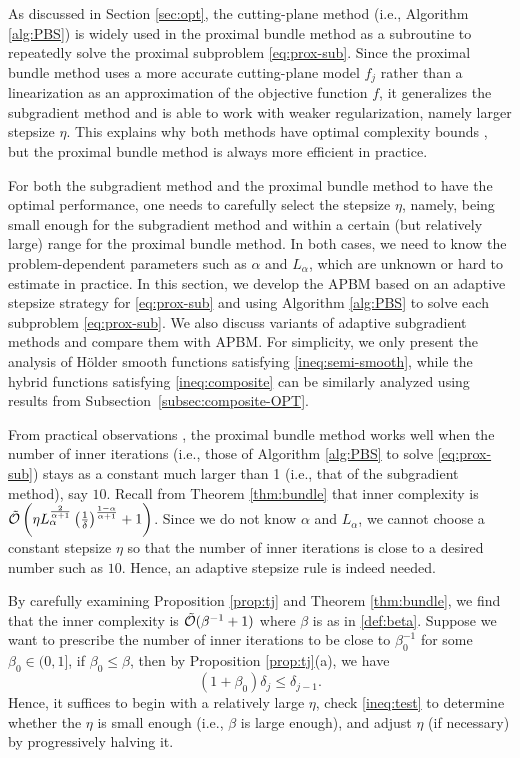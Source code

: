 \documentclass[11pt,letterpaper]{article}
\begin{document}
As discussed in Section \ref{sec:opt}, the cutting-plane method (i.e., Algorithm \ref{alg:PBS}) is widely used in the proximal bundle method as a subroutine to repeatedly solve the proximal subproblem \eqref{eq:prox-sub}.
Since the proximal bundle method uses a more accurate cutting-plane model $f_j$ rather than a linearization as an approximation of the objective function $f$, it generalizes the subgradient method and is able to work with weaker regularization, namely larger stepsize $\eta$. This explains why both methods have optimal complexity bounds \cite{liang2024unified,liang2020proximal}, but the proximal bundle method is always more efficient in practice.

For both the subgradient method and the proximal bundle method to have the optimal performance, one needs to carefully select the stepsize $\eta$, namely, being small enough for the subgradient method and within a certain (but relatively large) range for the proximal bundle method. In both cases, we need to know the problem-dependent parameters such as $\alpha$ and $L_\alpha$, which are unknown or hard to estimate in practice.
In this section, we develop the APBM based on an adaptive stepsize strategy for \eqref{eq:prox-sub} and using Algorithm \ref{alg:PBS} to solve each subproblem \eqref{eq:prox-sub}.
We also discuss variants of adaptive subgradient methods and compare them with APBM.
For simplicity, we only present the analysis of Hölder smooth functions satisfying \eqref{ineq:semi-smooth}, while the hybrid functions satisfying \eqref{ineq:composite} can be similarly analyzed using results from Subsection~\ref{subsec:composite-OPT}.


From practical observations \cite{liang2024single}, the proximal bundle method works well when the number of inner iterations (i.e., those of Algorithm \ref{alg:PBS} to solve \eqref{eq:prox-sub}) stays as a constant much larger than 1 (i.e., that of the subgradient method), say $10$. Recall from Theorem \ref{thm:bundle} that inner complexity is $\tilde {\cal O}\left(\eta L_\alpha^{\frac{2}{\alpha+1}} \left(\frac{1}{\delta}\right)^{\frac{1-\alpha}{\alpha+1}} + 1\right)$. Since we do not know $\alpha$ and $L_\alpha$, we cannot choose a constant stepsize $\eta$ so that the number of inner iterations is close to a desired number such as $10$. Hence, an adaptive stepsize rule is indeed needed.

By carefully examining Proposition \ref{prop:tj} and Theorem \ref{thm:bundle}, we find that the inner complexity is $\tilde {\cal O}(\beta^{-1}+1)$ where $\beta$ is as in \eqref{def:beta}. Suppose we want to prescribe the number of inner iterations to be close to $\beta_0^{-1}$ for some $\beta_0\in(0,1]$, if $\beta_0 \le \beta$, then by Proposition \ref{prop:tj}(a), we have
\begin{equation}\label{ineq:test}
(1+\beta_0) \delta_{j} \le \delta_{j-1}.
\end{equation}
Hence, it suffices to begin with a relatively large $\eta$, check \eqref{ineq:test} to determine whether the $\eta$ is small enough (i.e., $\beta$ is large enough), and adjust $\eta$ (if necessary) by progressively halving it.
\end{document}
